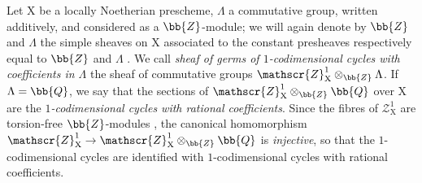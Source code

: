 \begin{env}[21.10.9]
\label{IV.21.10.9}
Let $\mathrm{X}$ be a locally Noetherian prescheme, $\Lambda$ a commutative group, written additively, and considered as a $\bb{Z}$-module; we will again denote by $\bb{Z}$ and $\Lambda$ the simple sheaves on $\mathrm{X}$ associated to the constant presheaves respectively equal to $\bb{Z}$ and $\Lambda$ .
We call \emph{sheaf of germs of $1$-codimensional cycles with coefficients in $\Lambda$} the sheaf of commutative groups $\mathscr{Z}^1_{\mathrm{X}}\otimes_{\bb{Z}}\Lambda$.
If $\Lambda=\bb{Q}$, we say that the sections
of $\mathscr{Z}^1_{\mathrm{X}}\otimes_{\bb{Z}}\bb{Q}$ over $\mathrm{X}$ are the \emph{$1$-codimensional cycles with rational coefficients}.
Since the fibres of $\mathscr{Z}^1_{\mathrm{X}}$ are torsion-free $\bb{Z}$-modules , the canonical homomorphism $\mathscr{Z}^1_{\mathrm{X}}\to\mathscr{Z}^1_{\mathrm{X}}\otimes_{\bb{Z}}\bb{Q}$ is \emph{injective}, so that the $1$-codimensional cycles are identified with $1$-codimensional cycles with rational coefficients.
\end{env}

